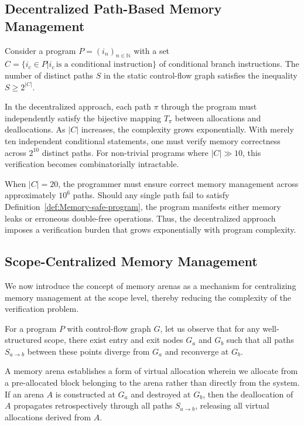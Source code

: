 \subsection{Decentralized Path-Based Memory Management}
\label{subsec:Decentralized-Path-Based-Memory-Management}

Consider a program $P = (i_n)_{n \in \mathbb{N}}$ with a set $C = \{i_c \in P | i_c\, \text{is a conditional instruction}\}$ of conditional branch instructions. The number of distinct paths $S$ in the static control-flow graph satisfies the inequality $S \geq 2^{|C|}$.

In the decentralized approach, each path $\pi$ through the program must independently satisfy the bijective mapping $T_{\pi}$ between allocations and deallocations. As $|C|$ increases, the complexity grows exponentially. With merely ten independent conditional statements, one must verify memory correctness across $2^{10}$ distinct paths. For non-trivial programs where $|C| \gg 10$, this verification becomes combinatorially intractable.

When $|C| = 20$, the programmer must ensure correct memory management across approximately $10^6$ paths. Should any single path fail to satisfy Definition~\ref{def:Memory-safe-program}, the program manifests either memory leaks or erroneous double-free operations. Thus, the decentralized approach imposes a verification burden that grows exponentially with program complexity.

\subsection{Scope-Centralized Memory Management}
\label{subsec:Scope-Centralized-Memory-Management}

We now introduce the concept of memory arenas as a mechanism for centralizing memory management at the scope level, thereby reducing the complexity of the verification problem.

For a program $P$ with control-flow graph $G$, let us observe that for any well-structured scope, there exist entry and exit nodes $G_a$ and $G_b$ such that all paths $S_{a \rightarrow b}$ between these points diverge from $G_a$ and reconverge at $G_b$.

A memory arena establishes a form of virtual allocation wherein we allocate from a pre-allocated block belonging to the arena rather than directly from the system.
If an arena $A$ is constructed at $G_a$ and destroyed at $G_b$, then the deallocation of $A$ propagates retrospectively through all paths $S_{a \rightarrow b}$,
releasing all virtual allocations derived from $A$.

